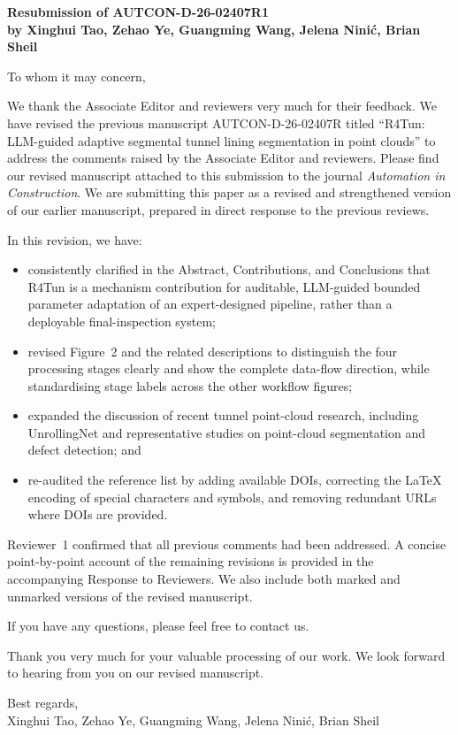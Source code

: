 \documentclass[11pt,a4paper]{article}
\begin{document}
\begin{center}
{\Large\textbf{Resubmission of AUTCON-D-26-02407R1}}\\[0.6em]
\textbf{by Xinghui Tao, Zehao Ye, Guangming Wang, Jelena Ninić, Brian Sheil}
\end{center}

\bigskip

To whom it may concern,

We thank the Associate Editor and reviewers very much for their feedback. We have revised the previous manuscript AUTCON-D-26-02407R titled ``R4Tun: LLM-guided adaptive segmental tunnel lining segmentation in point clouds'' to address the comments raised by the Associate Editor and reviewers. Please find our revised manuscript attached to this submission to the journal \textit{Automation in Construction}. We are submitting this paper as a revised and strengthened version of our earlier manuscript, prepared in direct response to the previous reviews.

In this revision, we have:
\begin{itemize}[nosep,leftmargin=*]
  \item consistently clarified in the Abstract, Contributions, and Conclusions that R4Tun is a mechanism contribution for auditable, LLM-guided bounded parameter adaptation of an expert-designed pipeline, rather than a deployable final-inspection system;
  \item revised Figure~2 and the related descriptions to distinguish the four processing stages clearly and show the complete data-flow direction, while standardising stage labels across the other workflow figures;
  \item expanded the discussion of recent tunnel point-cloud research, including UnrollingNet and representative studies on point-cloud segmentation and defect detection; and
  \item re-audited the reference list by adding available DOIs, correcting the \LaTeX{} encoding of special characters and symbols, and removing redundant URLs where DOIs are provided.
\end{itemize}

Reviewer~1 confirmed that all previous comments had been addressed. A concise point-by-point account of the remaining revisions is provided in the accompanying Response to Reviewers. We also include both marked and unmarked versions of the revised manuscript.

If you have any questions, please feel free to contact us.

Thank you very much for your valuable processing of our work. We look forward to hearing from you on our revised manuscript.

\bigskip
\noindent Best regards,\\
Xinghui Tao, Zehao Ye, Guangming Wang, Jelena Ninić, Brian Sheil
\end{document}
